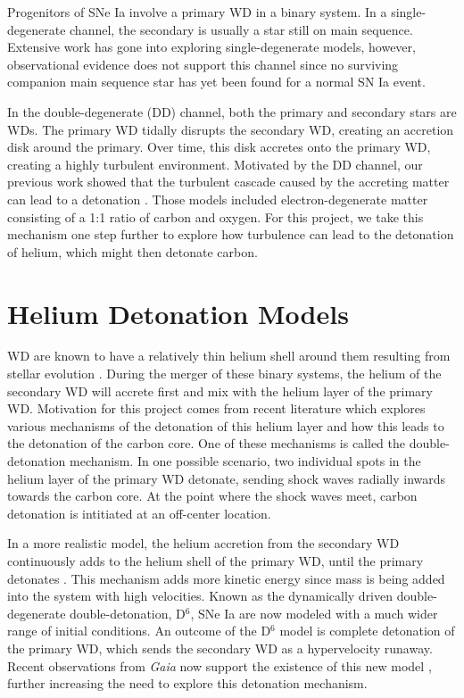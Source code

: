 Progenitors of SNe Ia involve a primary WD in a binary system. In a single-degenerate channel, the secondary is usually a star still on main sequence. Extensive work has gone into exploring single-degenerate models, however, observational evidence does not support this channel since no surviving companion main sequence star has yet been found for a normal SN Ia event.

In the double-degenerate (DD) channel, both the primary and secondary stars are WDs. The primary WD tidally disrupts the secondary WD, creating an accretion disk around the primary. Over time, this disk accretes onto the primary WD, creating a highly turbulent environment. Motivated by the DD channel, our previous work showed that the turbulent cascade caused by the accreting matter can lead to a detonation \cite{Fisher}. Those models included electron-degenerate matter consisting of a 1:1 ratio of carbon and oxygen. For this project, we take this mechanism one step further to explore how turbulence can lead to the detonation of helium, which might then detonate carbon.   

\section{Helium Detonation Models}

WD are known to have a relatively thin helium shell around them resulting from stellar evolution \cite{giammichele}. During the merger of these binary systems, the helium of the secondary WD will accrete first and mix with the helium layer of the primary WD. Motivation for this project comes from recent literature which explores various mechanisms of the detonation of this helium layer and how this leads to the detonation of the carbon core. One of these mechanisms is called the double-detonation mechanism. In one possible scenario, two individual spots in the helium layer of the primary WD detonate, sending shock waves radially inwards towards the carbon core. At the point where the shock waves meet, carbon detonation is intitiated at an off-center location. 

In a more realistic model, the helium accretion from the secondary WD continuously adds to the helium shell of the primary WD, until the primary detonates \cite{Shen}. This mechanism adds more kinetic energy since mass is being added into the system with high velocities. Known as the dynamically driven double-degenerate double-detonation, D$^6$, SNe Ia are now modeled with a much wider range of initial conditions. An outcome of the D$^6$ model is complete detonation of the primary WD, which sends the secondary WD as a hypervelocity runaway. Recent observations from \textit{Gaia} now support the existence of this new model \cite{Gaia}, further increasing the need to explore this detonation mechanism.

